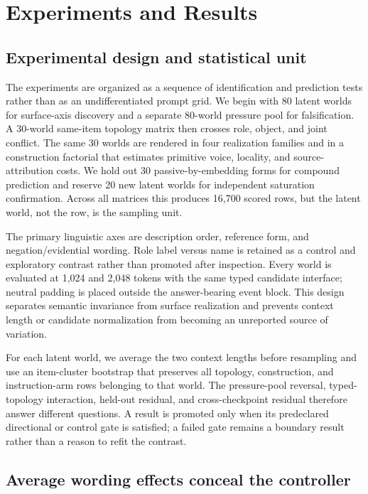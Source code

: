 \section{Experiments and Results}

\subsection{Experimental design and statistical unit}

The experiments are organized as a sequence of identification and prediction
tests rather than as an undifferentiated prompt grid. We begin with 80 latent
worlds for surface-axis discovery and a separate 80-world pressure pool for
falsification. A 30-world same-item topology matrix then crosses role, object,
and joint conflict. The same 30 worlds are rendered in four realization
families and in a construction factorial that estimates primitive voice,
locality, and source-attribution costs. We hold out 30 passive-by-embedding
forms for compound prediction and reserve 20 new latent worlds for independent
saturation confirmation. Across all matrices this produces 16,700 scored rows,
but the latent world, not the row, is the sampling unit.

The primary linguistic axes are description order, reference form, and
negation/evidential wording. Role label versus name is retained as a control and
exploratory contrast rather than promoted after inspection. Every world is
evaluated at 1,024 and 2,048 tokens with the same typed candidate interface;
neutral padding is placed outside the answer-bearing event block. This design
separates semantic invariance from surface realization and prevents context
length or candidate normalization from becoming an unreported source of
variation.

For each latent world, we average the two context lengths before resampling and
use an item-cluster bootstrap that preserves all topology, construction, and
instruction-arm rows belonging to that world. The pressure-pool reversal,
typed-topology interaction, held-out residual, and cross-checkpoint residual
therefore answer different questions. A result is promoted only when its
predeclared directional or control gate is satisfied; a failed gate remains a
boundary result rather than a reason to refit the contrast.

\subsection{Average wording effects conceal the controller}

